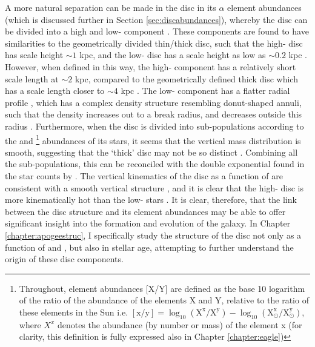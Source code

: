 A more natural separation can be made in the disc in its $\alpha$ element abundances (which is discussed further in Section \ref{sec:discabundances}), whereby the disc can be divided into a high and low-\afe{} component \citep[e.g.][]{1998A&A...338..161F,2003A&A...410..527B,2005A&A...433..185B,2013A&A...560A.109H,2014A&A...562A..71B,2014A&A...564A.115A,2014ApJ...796...38N,2015ApJ...808..132H}. These components are found to have similarities to the geometrically divided thin/thick disc, such that the high-\afe{} disc has scale height $\sim 1$ kpc, and the low-\afe{} disc has a scale height as low as $\sim 0.2$ kpc \citep[e.g.][]{2012ApJ...753..148B,2016ApJ...823...30B}. However, when defined in this way, the high-\afe{} component has a relatively short scale length at $\sim 2$ kpc, compared to the geometrically defined thick disc which has a scale length closer to $\sim4$ kpc \citep{2008ApJ...673..864J}. The low-\afe{} component has a flatter radial profile \citep{2012ApJ...752...51C}, which has a complex density structure resembling donut-shaped annuli, such that the density increases out to a break radius, and decreases outside this radius \citep{2012ApJ...753..148B,2016ApJ...823...30B}. Furthermore, when the disc is divided into sub-populations according to the \afe{} and \feh{}\footnote{Throughout, element abundances [X/Y] are defined as the base 10 logarithm of the ratio of the abundance of the elements X and Y, relative to the ratio of these elements in the Sun i.e. $\mathrm{[x/y]} = \log_{10}(\mathrm{X^{x}/X^{y}})-\log_{10}(\mathrm{X^{x}_{\odot}/X^{y}_{\odot}})$, where $X^{x}$ denotes the abundance (by number or mass) of the element x (for clarity, this definition is fully expressed also in Chapter \ref{chapter:eagle})} abundances of its stars, it seems that the vertical mass distribution is smooth, suggesting that the `thick' disc may not be so distinct \citep{2012ApJ...751..131B}. Combining all the sub-populations, this can be reconciled with the double exponential found in the star counts by \citet{1983MNRAS.202.1025G} \citep[see][]{2013A&ARv..21...61R}. The vertical kinematics of the disc as a function of \afe{} are consistent with a smooth vertical structure \citep{2012ApJ...755..115B}, and it is clear that the high-\afe{} disc is more kinematically hot than the low-\afe{} stars \citep[e.g.][]{2005A&A...433..185B}. It is clear, therefore, that the link between the disc structure and its element abundances may be able to offer significant insight into the formation and evolution of the galaxy. In Chapter \ref{chapter:apogeestruc}, I specifically study the structure of the disc not only as a function of \afe{} and \feh{}, but also in stellar age, attempting to further understand the origin of these disc components.

